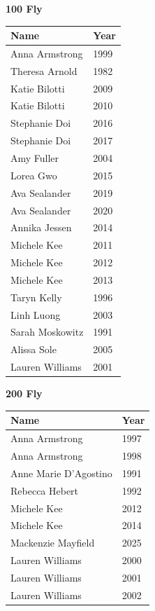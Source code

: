 \begin{minipage}[t]{0.48\textwidth}
\centering
\textbf{\textcolor{teamprimary}{100 Fly}}\par
\vspace{0.5em}
\centering
\small
\renewcommand{\arraystretch}{1.0}
\setlength{\tabcolsep}{4pt}
\begin{tabular}{@{}p{3.0cm}p{1.0cm}@{}}
\toprule
\textbf{Name} & \textbf{Year} \\
\midrule
Anna Armstrong & 1999 \\
Theresa Arnold & 1982 \\
Katie Bilotti & 2009 \\
Katie Bilotti & 2010 \\
Stephanie Doi & 2016 \\
Stephanie Doi & 2017 \\
Amy Fuller & 2004 \\
Lorea Gwo & 2015 \\
Ava Sealander & 2019 \\
Ava Sealander & 2020 \\
Annika Jessen & 2014 \\
Michele Kee & 2011 \\
Michele Kee & 2012 \\
Michele Kee & 2013 \\
Taryn Kelly & 1996 \\
Linh Luong & 2003 \\
Sarah Moskowitz & 1991 \\
Alissa Sole & 2005 \\
Lauren Williams & 2001 \\
\bottomrule
\end{tabular}
\end{minipage}
\vspace{1.2em}
\noindent\begin{minipage}[t]{0.48\textwidth}
\centering
\textbf{\textcolor{teamprimary}{200 Fly}}\par
\vspace{0.5em}
\centering
\small
\renewcommand{\arraystretch}{1.0}
\setlength{\tabcolsep}{4pt}
\begin{tabular}{@{}p{3.0cm}p{1.0cm}@{}}
\toprule
\textbf{Name} & \textbf{Year} \\
\midrule
Anna Armstrong & 1997 \\
Anna Armstrong & 1998 \\
Anne Marie D'Agostino & 1991 \\
Rebecca Hebert & 1992 \\
Michele Kee & 2012 \\
Michele Kee & 2014 \\
Mackenzie Mayfield & 2025 \\
Lauren Williams & 2000 \\
Lauren Williams & 2001 \\
Lauren Williams & 2002 \\
\bottomrule
\end{tabular}
\end{minipage}

